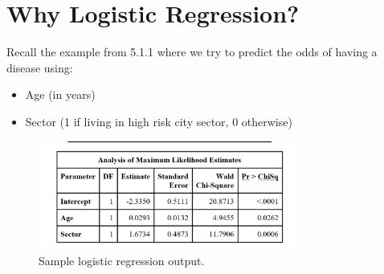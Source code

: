 \documentclass[12pt]{../notes}
\begin{document}

\section{Why Logistic Regression?}

Recall the example from 5.1.1 where we try to predict the odds of having a disease using:
\begin{itemize}
\item Age (in years)
\item Sector (1 if living in high risk city sector, 0 otherwise)
\end{itemize}


\begin{minipage}[l][5cm][c]{\textwidth}

\end{minipage}

\nspace
{}

\begin{minipage}[l][5cm][c]{\textwidth}

\end{minipage}




\begin{figure}[H]
\centering
\includegraphics[width = 0.75\textwidth]{../figures/module5/logit_output_sample.png}
\caption{Sample logistic regression output.}
\label{fig:logit_output}
\end{figure}
\end{document}
